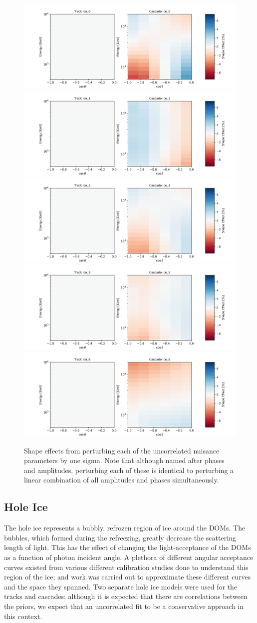 \documentclass[main.tex]{subfiles}
\begin{document}
\begin{figure}
    \centering
    \includegraphics[width=0.45\linewidth]{figures/systematics/ice_0.png}%
    \includegraphics[width=0.45\linewidth]{figures/systematics/ice_1.png}\\
    \includegraphics[width=0.45\linewidth]{figures/systematics/ice_3.png}%
    \includegraphics[width=0.45\linewidth]{figures/systematics/ice_5.png}\\
    \includegraphics[width=0.45\linewidth]{figures/systematics/ice_6.png}
    \caption{Shape effects from perturbing each of the uncorrelated nuisance parameters by one sigma. Note that although named after phases and amplitudes, perturbing each of these is identical to perturbing a linear combination of all amplitudes and phases simultaneously.}\label{fig:rotata}
\end{figure}


\subsection{Hole Ice}

The hole ice represents a bubbly, refrozen region of ice around the DOMs. 
The bubbles, which formed during the refreezing, greatly decrease the scattering length of light. 
This has the effect of changing the light-acceptance of the DOMs as a function of photon incident angle. 
A plethora of different angular acceptance curves existed from various different calibration studies done to understand this region of the ice; and work was carried out to approximate these different curves and the space they spanned. 
Two separate hole ice models were used for the tracks and cascades; although it is expected that there are correlations between the priors, we expect that an uncorrelated fit to be a conservative approach in this context.  
\end{document}
